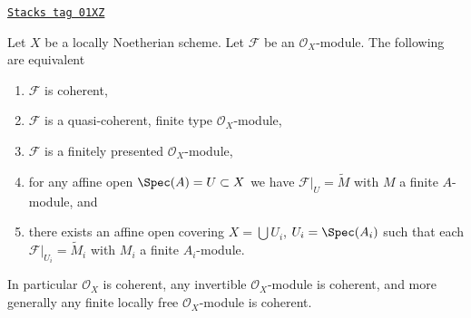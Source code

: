 \begin{lemma}
\label{coherent-lemma-coherent-Noetherian}
\href{https://stacks.math.columbia.edu/tag/01XZ}{\texttt{Stacks tag 01XZ}}

Let $X$ be a locally Noetherian scheme.
Let $\mathcal{F}$ be an $\mathcal{O}_X$-module.
The following are equivalent
\begin{enumerate}
\item $\mathcal{F}$ is coherent,
\item $\mathcal{F}$ is a quasi-coherent, finite type $\mathcal{O}_X$-module,
\item $\mathcal{F}$ is a finitely presented $\mathcal{O}_X$-module,
\item for any affine open $\Spec(A) = U \subset X$ we have
$\mathcal{F}|_U = \widetilde M$ with $M$ a finite $A$-module, and
\item there exists an affine open covering $X = \bigcup U_i$,
$U_i = \Spec(A_i)$ such that each
$\mathcal{F}|_{U_i} = \widetilde M_i$ with $M_i$ a finite $A_i$-module.
\end{enumerate}
In particular $\mathcal{O}_X$ is coherent, any invertible
$\mathcal{O}_X$-module is coherent, and more generally any
finite locally free $\mathcal{O}_X$-module is coherent.
\end{lemma}

